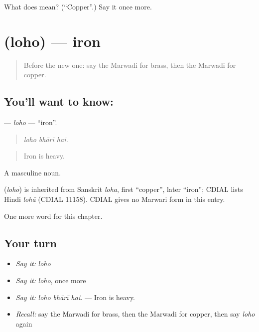 \begin{tcolorbox}[breakable,colback=teal!4,colframe=teal!35!black,title={Before you move on}]
What does  mean? (\textquotedblleft{}Copper\textquotedblright{}.) Say it once more.
\end{tcolorbox}
\section[\texorpdfstring{\mw{लोहो} (loho)}{लोहो (loho)}]{ (loho) — iron}

\label{lesson:MW-C184-loho}



\begin{quote}
Before the new one: say the Marwadi for brass, then the Marwadi for copper.
\end{quote}

\subsection*{You'll want to know: }
\textbf{} — \emph{loho} — \textquotedblleft{}iron\textquotedblright{}.

\begin{quote}
  
\end{quote}

\begin{quote}
\emph{loho bhārī hai.}
\end{quote}

\begin{quote}
Iron is heavy.
\end{quote}

A masculine noun.

\begin{cousinweb}
\textbf{} (\emph{loho}) is inherited from Sanskrit \emph{loha}, first \textquotedblleft{}copper\textquotedblright{}, later \textquotedblleft{}iron\textquotedblright{}; CDIAL lists Hindi \emph{lohā} (CDIAL 11158). CDIAL gives no Marwari form in this entry.
\end{cousinweb}

\begin{grammarlens}[title={What you've built}]
One more word for this chapter.
\end{grammarlens}

\subsection*{Your turn}
\begin{itemize}
\raggedright
  \item \emph{Say it:} \emph{loho}
  \item \emph{Say it:} \emph{loho}, once more
  \item \emph{Say it:} \emph{loho bhārī hai.} — Iron is heavy.
  \item \emph{Recall:} say the Marwadi for brass, then the Marwadi for copper, then say \emph{loho} again
\end{itemize}

